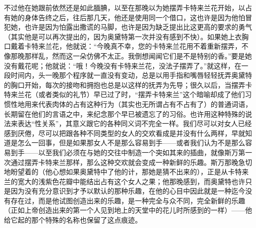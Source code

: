 \par 不过他在她跟前依然还是如此腼腆，以至在那晚以为她摆弄卡特来兰花开始，以占有她的身体告终之后，往后那几天，他还是使用同一个借口，这也许是因为他怕冒犯她，也许是因为怕露出撒谎的马脚，也许是因为缺乏提出比这更高的要求的勇气（其实他是可以再次提出的，因为奥黛特第一次并没有感到不快）。如果她上衣胸口戴着卡特来兰花，他就说：“今晚真不幸，您的卡特来兰花用不着重新摆弄，不像那晚那样乱，然而这一朵仿佛不太正。我倒想闻闻它们是不是特别的香。”要是她没有戴花呢；他就说：“哦！今晚没有卡特来兰花，没法子摆弄了。”就这样，在一段时间内，头一晚那个程序就一直没有变动，总是以用手指和嘴唇轻轻抚弄奥黛特的胸口开始，每次的接吻和拥抱也总是以这样的抚弄为先导；很久以后，当摆弄卡特来兰花（或者类似的礼节）早已过了时，“摆弄卡特来兰”这个暗喻却成了他们习惯性地用来代表肉体的占有这种行为（其实也无所谓占有不占有了）的普通词语，长期留在他们的言语之中，来纪念那个早已被遗忘了的习俗。也许用这种特殊的说法来表达“性关系”，其意义跟它的各种同义词不完全一样。我们尽可以对女人已经感到厌倦，尽可以把跟各种不同类型的女人的交欢看成是并没有什么两样，早就知道是怎么一回事，但是如果那女人不是那么容易到手——或者我们认为不是那么容易到手——以至我们必须在与她的交往中制造一个突如其来的插曲，就像斯万第一次通过摆弄卡特来兰那样，那么这种交欢就会变成一种新鲜的乐趣。斯万那晚急切地盼望着的（他心想如果奥黛特中了他的计，那她是猜不出来的），正是从卡特来兰的宽大的浅紫色花瓣中能结出占有这个女人之果；他那晚感到，而奥黛特也许只是因为没有充分意识到才予以默认的那种乐趣，在他的心目中因此就是一种迄今没有存在过，而是他试图创造出来的乐趣，是一种完全与众不同，完全新鲜的乐趣（正如上帝创造出来的第一个人见到地上的天堂中的花儿时所感到的一样）——他给它起的那个特殊的名称也保留了这点痕迹。
